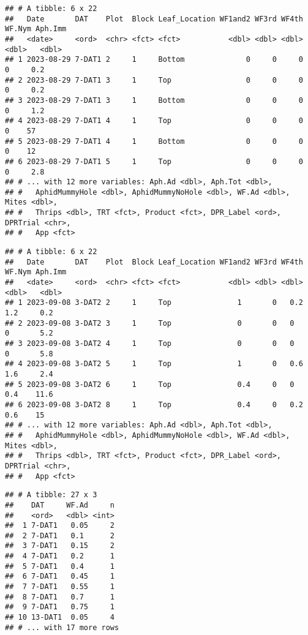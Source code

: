\documentclass[
]{article}
\begin{document}
\begin{verbatim}
## # A tibble: 6 x 22
##   Date       DAT    Plot  Block Leaf_Location WF1and2 WF3rd WF4th WF.Nym Aph.Imm
##   <date>     <ord>  <chr> <fct> <fct>           <dbl> <dbl> <dbl>  <dbl>   <dbl>
## 1 2023-08-29 7-DAT1 2     1     Bottom              0     0     0      0     0.2
## 2 2023-08-29 7-DAT1 3     1     Top                 0     0     0      0     0.2
## 3 2023-08-29 7-DAT1 3     1     Bottom              0     0     0      0     1.2
## 4 2023-08-29 7-DAT1 4     1     Top                 0     0     0      0    57  
## 5 2023-08-29 7-DAT1 4     1     Bottom              0     0     0      0    12  
## 6 2023-08-29 7-DAT1 5     1     Top                 0     0     0      0     2.8
## # ... with 12 more variables: Aph.Ad <dbl>, Aph.Tot <dbl>,
## #   AphidMummyHole <dbl>, AphidMummyNoHole <dbl>, WF.Ad <dbl>, Mites <dbl>,
## #   Thrips <dbl>, TRT <fct>, Product <fct>, DPR_Label <ord>, DPRTrial <chr>,
## #   App <fct>
\end{verbatim}

\begin{verbatim}
## # A tibble: 6 x 22
##   Date       DAT    Plot  Block Leaf_Location WF1and2 WF3rd WF4th WF.Nym Aph.Imm
##   <date>     <ord>  <chr> <fct> <fct>           <dbl> <dbl> <dbl>  <dbl>   <dbl>
## 1 2023-09-08 3-DAT2 2     1     Top               1       0   0.2    1.2     0.2
## 2 2023-09-08 3-DAT2 3     1     Top               0       0   0      0       5.2
## 3 2023-09-08 3-DAT2 4     1     Top               0       0   0      0       5.8
## 4 2023-09-08 3-DAT2 5     1     Top               1       0   0.6    1.6     2.4
## 5 2023-09-08 3-DAT2 6     1     Top               0.4     0   0      0.4    11.6
## 6 2023-09-08 3-DAT2 8     1     Top               0.4     0   0.2    0.6    15  
## # ... with 12 more variables: Aph.Ad <dbl>, Aph.Tot <dbl>,
## #   AphidMummyHole <dbl>, AphidMummyNoHole <dbl>, WF.Ad <dbl>, Mites <dbl>,
## #   Thrips <dbl>, TRT <fct>, Product <fct>, DPR_Label <ord>, DPRTrial <chr>,
## #   App <fct>
\end{verbatim}

\begin{verbatim}
## # A tibble: 27 x 3
##    DAT     WF.Ad     n
##    <ord>   <dbl> <int>
##  1 7-DAT1   0.05     2
##  2 7-DAT1   0.1      2
##  3 7-DAT1   0.15     2
##  4 7-DAT1   0.2      1
##  5 7-DAT1   0.4      1
##  6 7-DAT1   0.45     1
##  7 7-DAT1   0.55     1
##  8 7-DAT1   0.7      1
##  9 7-DAT1   0.75     1
## 10 13-DAT1  0.05     4
## # ... with 17 more rows
\end{verbatim}
\end{document}

